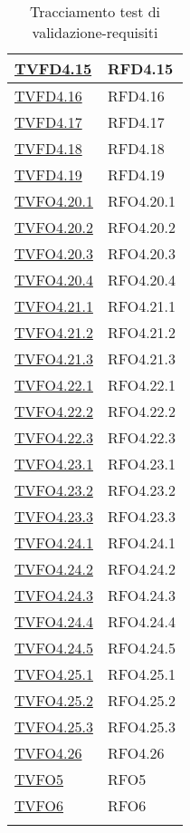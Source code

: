 \begin{longtable}{|>{\centering}m{5cm}|m{5cm}<{\centering}|}
\hyperlink{TVFD4.15}{TVFD4.15} & RFD4.15\\ \hline
\hyperlink{TVFD4.16}{TVFD4.16} & RFD4.16\\ \hline
\hyperlink{TVFD4.17}{TVFD4.17} & RFD4.17\\ \hline
\hyperlink{TVFD4.18}{TVFD4.18} & RFD4.18\\ \hline
\hyperlink{TVFD4.19}{TVFD4.19} & RFD4.19\\ \hline
\hyperlink{TVFO4.20.1}{TVFO4.20.1} & RFO4.20.1\\ \hline
\hyperlink{TVFO4.20.2}{TVFO4.20.2} & RFO4.20.2\\ \hline
\hyperlink{TVFO4.20.3}{TVFO4.20.3} & RFO4.20.3\\ \hline
\hyperlink{TVFO4.20.4}{TVFO4.20.4} & RFO4.20.4\\ \hline
\hyperlink{TVFO4.21.1}{TVFO4.21.1} & RFO4.21.1\\ \hline
\hyperlink{TVFO4.21.2}{TVFO4.21.2} & RFO4.21.2\\ \hline
\hyperlink{TVFO4.21.3}{TVFO4.21.3} & RFO4.21.3\\ \hline
\hyperlink{TVFO4.22.1}{TVFO4.22.1} & RFO4.22.1\\ \hline
\hyperlink{TVFO4.22.2}{TVFO4.22.2} & RFO4.22.2\\ \hline
\hyperlink{TVFO4.22.3}{TVFO4.22.3} & RFO4.22.3\\ \hline
\hyperlink{TVFO4.23.1}{TVFO4.23.1} & RFO4.23.1\\ \hline
\hyperlink{TVFO4.23.2}{TVFO4.23.2} & RFO4.23.2\\ \hline
\hyperlink{TVFO4.23.3}{TVFO4.23.3} & RFO4.23.3\\ \hline
\hyperlink{TVFO4.24.1}{TVFO4.24.1} & RFO4.24.1\\ \hline
\hyperlink{TVFO4.24.2}{TVFO4.24.2} & RFO4.24.2\\ \hline
\hyperlink{TVFO4.24.3}{TVFO4.24.3} & RFO4.24.3\\ \hline
\hyperlink{TVFO4.24.4}{TVFO4.24.4} & RFO4.24.4\\ \hline
\hyperlink{TVFO4.24.5}{TVFO4.24.5} & RFO4.24.5\\ \hline
\hyperlink{TVFO4.25.1}{TVFO4.25.1} & RFO4.25.1\\ \hline
\hyperlink{TVFO4.25.2}{TVFO4.25.2} & RFO4.25.2\\ \hline
\hyperlink{TVFO4.25.3}{TVFO4.25.3} & RFO4.25.3\\ \hline
\hyperlink{TVFO4.26}{TVFO4.26} & RFO4.26\\ \hline
\hyperlink{TVFO5}{TVFO5} & RFO5\\ \hline
\hyperlink{TVFO6}{TVFO6} & RFO6\\ \hline
\caption[Tracciamento test di validazione-requisiti]{Tracciamento test di validazione-requisiti}
\label{tabella:tv-requi}
\end{longtable}
\clearpage



